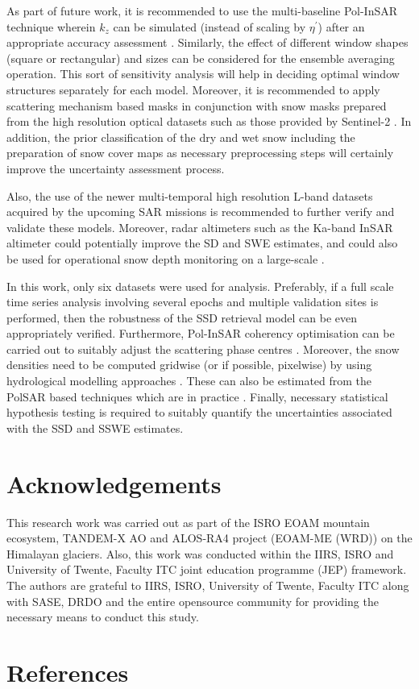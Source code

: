 \documentclass[12pt]{elsarticle}
\numberwithin{equation}{section}
\numberwithin{figure}{section}
\numberwithin{table}{section}
\begin{document}
As part of future work, it is recommended to use the multi-baseline Pol-InSAR technique \citep{Cloude2010} wherein $k_z$ can be simulated (instead of scaling by $\eta^\prime$) after an appropriate accuracy assessment \citep{Kumar2017}. Similarly, the effect of different window shapes (square or rectangular) and sizes can be considered for the ensemble averaging operation. This sort of sensitivity analysis will help in deciding optimal window structures separately for each model. Moreover, it is recommended to apply scattering mechanism based masks in conjunction with snow masks prepared from the high resolution optical datasets such as those provided by Sentinel-2 \citep{Zhu2015}. In addition, the prior classification of the dry and wet snow including the preparation of snow cover maps \citep{Leinss2018, Thakur2012, Zhu2015} as necessary preprocessing steps will certainly improve the uncertainty assessment process.

Also, the use of the newer multi-temporal high resolution L-band datasets acquired by the upcoming SAR missions \citep{Tridon2018, Rosen2017} is recommended to further verify and validate these models. Moreover, radar altimeters such as the Ka-band InSAR altimeter could potentially improve the SD and SWE estimates, and could also be used for operational snow depth monitoring on a large-scale \citep{Hensley2016, Kim2018, Moller2011, Speziali2018}.

In this work, only six datasets were used for analysis. Preferably, if a full scale time series analysis involving several epochs and multiple validation sites is performed, then the robustness of the SSD retrieval model can be even appropriately verified. Furthermore, Pol-InSAR coherency optimisation can be carried out to suitably adjust the scattering phase centres \citep{Cloude2005, Cloude2010}. Moreover, the snow densities need to be computed gridwise (or if possible, pixelwise) by using hydrological modelling approaches \citep{Bartelt2002, Liang1994}. These can also be estimated from the PolSAR based techniques which are in practice \citep{Singh2017, Thakur2012}. Finally, necessary statistical hypothesis testing is required to suitably quantify the uncertainties associated with the SSD and SSWE estimates.

\section*{Acknowledgements}
This research work was carried out as part of the ISRO EOAM mountain ecosystem, TANDEM-X AO and ALOS-RA4 project (EOAM-ME (WRD)) on the Himalayan glaciers. Also, this work was conducted within the IIRS, ISRO and University of Twente, Faculty ITC joint education programme (JEP) framework. The authors are grateful to IIRS, ISRO, University of Twente, Faculty ITC along with SASE, DRDO and the entire opensource community for providing the necessary means to conduct this study.  

\section*{References}
\footnotesize{}
\end{document}
